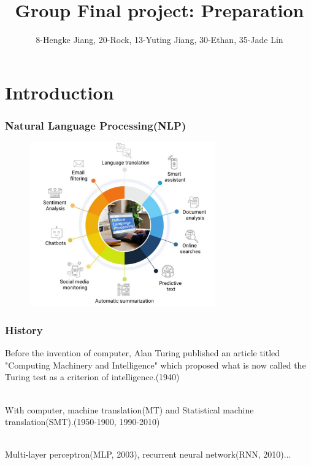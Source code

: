 \documentclass{beamer}
\title[Final project] 
{Group Final project: Preparation}
\author{8-Hengke Jiang, 20-Rock, 13-Yuting Jiang, 30-Ethan, 35-Jade Lin}
\date[6.30.2024] %
\begin{document}
\frame{\titlepage}
\section{Introduction}
\begin{frame}
  \frametitle{Natural Language Processing(NLP)}
  
  \begin{figure}[H]
    \centering
    \includegraphics[width=8cm]{pictures/屏幕截图 2024-06-30 163118.png}
  \end{figure}

\end{frame}
\begin{frame}
  \frametitle{History}
  Before the invention of computer, Alan Turing published an article titled "Computing Machinery and Intelligence" which proposed what is now called the Turing test as a criterion of intelligence.(1940)\\\

  With computer, machine translation(MT) and Statistical machine translation(SMT).(1950-1900, 1990-2010)\\\

  Multi-layer perceptron(MLP, 2003), recurrent neural network(RNN, 2010)...
\end{frame}
\end{document}
